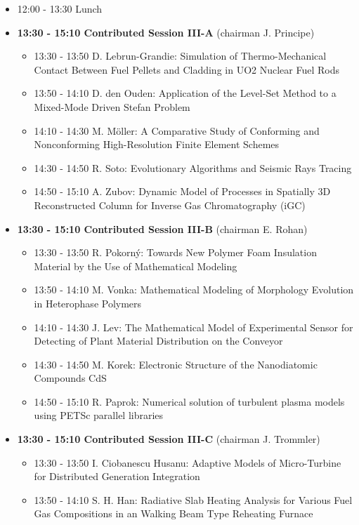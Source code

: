 \documentclass[10pt, A4]{article}%
\begin{document}
\begin{itemize}
\begin{itemize}
  \end{itemize}
  \item 12:00 - 13:30 Lunch
  \item {\bf 13:30 - 15:10 Contributed Session III-A} (chairman J. Principe) 
  \begin{itemize}
    \item 13:30 - 13:50 D. Lebrun-Grandie: Simulation of Thermo-Mechanical Contact Between Fuel Pellets and Cladding in UO2 Nuclear Fuel Rods
    \item 13:50 - 14:10 D. den Ouden: Application of the Level-Set Method to a Mixed-Mode Driven Stefan Problem
    \item 14:10 - 14:30 M. M\"{o}ller: A Comparative Study of Conforming and Nonconforming High-Resolution Finite Element Schemes
    \item 14:30 - 14:50 R. Soto: Evolutionary Algorithms and Seismic Rays Tracing
    \item 14:50 - 15:10 A. Zubov: Dynamic Model of Processes in Spatially 3D Reconstructed Column for Inverse Gas Chromatography (iGC)
  \end{itemize}
  \item {\bf 13:30 - 15:10 Contributed Session III-B} (chairman E. Rohan) 
  \begin{itemize}
    \item 13:30 - 13:50 R. Pokorn\'{y}: Towards New Polymer Foam Insulation Material by the Use of Mathematical Modeling
    \item 13:50 - 14:10 M. Vonka: Mathematical Modeling of Morphology Evolution in Heterophase Polymers
    \item 14:10 - 14:30 J. Lev: The Mathematical Model of Experimental Sensor for Detecting of Plant Material Distribution on the Conveyor
    \item 14:30 - 14:50 M. Korek: Electronic Structure of the Nanodiatomic Compounds CdS
    \item 14:50 - 15:10 R. Paprok: Numerical solution of turbulent plasma models using PETSc parallel libraries
  \end{itemize}
    \item {\bf 13:30 - 15:10 Contributed Session III-C} (chairman J. Trommler) 
  \begin{itemize}
    \item 13:30 - 13:50 I. Ciobanescu Husanu: Adaptive Models of Micro-Turbine for Distributed Generation Integration 
    \item 13:50 - 14:10 S. H. Han: Radiative Slab Heating Analysis for Various Fuel Gas Compositions in an Walking Beam Type Reheating Furnace

\end{itemize}
\end{itemize}
\end{document}
